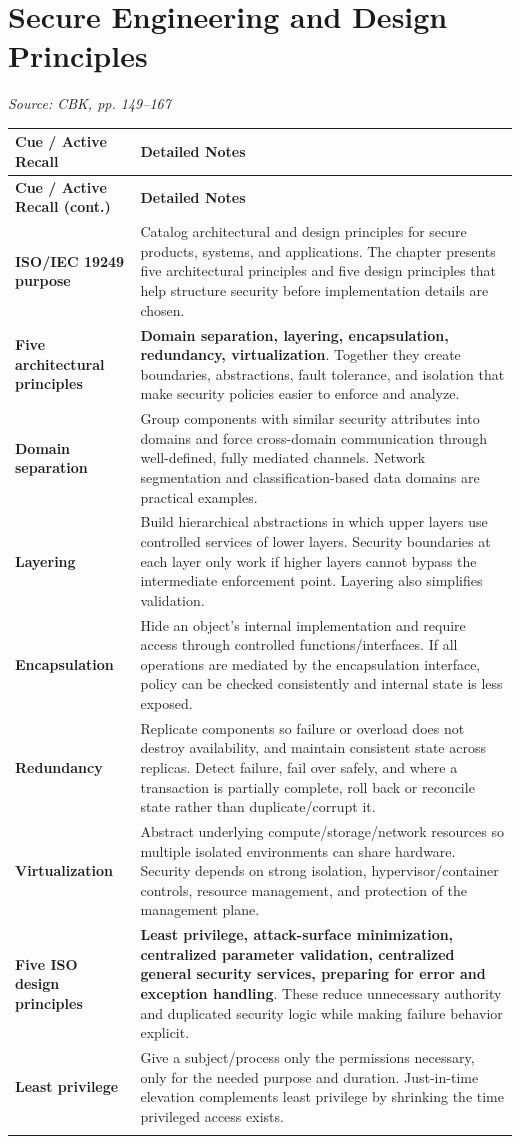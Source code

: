 \documentclass[10pt,letterpaper]{article}
\makeatletter
\newenvironment{cornell}{\rowcolors{2}{white}{notebg}\begin{longtable}{@{}>{\raggedright\arraybackslash\columncolor{cuebg}\color{navy}\bfseries}p{0.285\textwidth}>{\raggedright\arraybackslash}p{0.65\textwidth}@{}}
\rowcolor{navy}\color{white}\textbf{Cue / Active Recall} & \color{white}\textbf{Detailed Notes}\\ \hline\endfirsthead
\rowcolor{navy}\color{white}\textbf{Cue / Active Recall (cont.)} & \color{white}\textbf{Detailed Notes}\\ \hline\endhead}{\end{longtable}}
\newcommand{\noterow}[2]{#1 & #2\\\arrayrulecolor{line}\hline}
\newcommand{\source}[1]{\par{\footnotesize\color{teal}\textit{Source: CBK, #1}}\par}
\makeatother
\begin{document}
\section{\color{navy}Secure Engineering and Design Principles}
\source{pp. 149--167}
\begin{cornell}
\noterow{ISO/IEC 19249 purpose}{Catalog architectural and design principles for secure products, systems, and applications. The chapter presents five architectural principles and five design principles that help structure security before implementation details are chosen.}
\noterow{Five architectural principles}{\textbf{Domain separation, layering, encapsulation, redundancy, virtualization}. Together they create boundaries, abstractions, fault tolerance, and isolation that make security policies easier to enforce and analyze.}
\noterow{Domain separation}{Group components with similar security attributes into domains and force cross-domain communication through well-defined, fully mediated channels. Network segmentation and classification-based data domains are practical examples.}
\noterow{Layering}{Build hierarchical abstractions in which upper layers use controlled services of lower layers. Security boundaries at each layer only work if higher layers cannot bypass the intermediate enforcement point. Layering also simplifies validation.}
\noterow{Encapsulation}{Hide an object's internal implementation and require access through controlled functions/interfaces. If all operations are mediated by the encapsulation interface, policy can be checked consistently and internal state is less exposed.}
\noterow{Redundancy}{Replicate components so failure or overload does not destroy availability, and maintain consistent state across replicas. Detect failure, fail over safely, and where a transaction is partially complete, roll back or reconcile state rather than duplicate/corrupt it.}
\noterow{Virtualization}{Abstract underlying compute/storage/network resources so multiple isolated environments can share hardware. Security depends on strong isolation, hypervisor/container controls, resource management, and protection of the management plane.}
\noterow{Five ISO design principles}{\textbf{Least privilege, attack-surface minimization, centralized parameter validation, centralized general security services, preparing for error and exception handling}. These reduce unnecessary authority and duplicated security logic while making failure behavior explicit.}
\noterow{Least privilege}{Give a subject/process only the permissions necessary, only for the needed purpose and duration. Just-in-time elevation complements least privilege by shrinking the time privileged access exists.}

\end{cornell}
\end{document}
